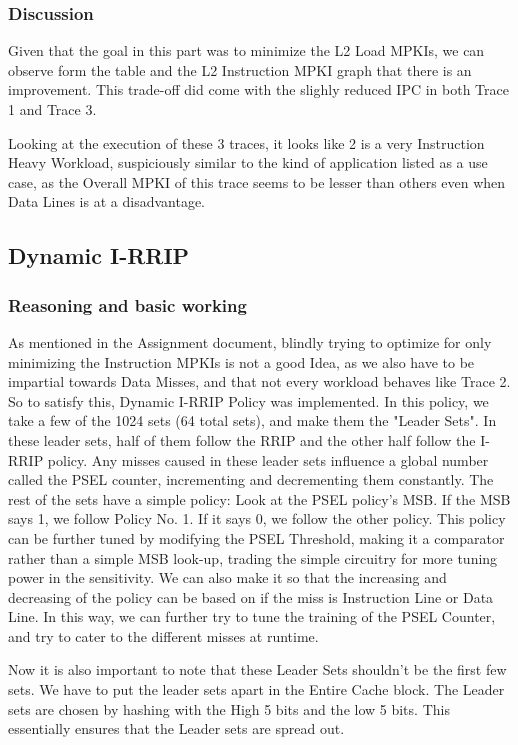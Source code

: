 \documentclass[11pt,a4paper]{article}
\begin{document}
\subsubsection{Discussion}
Given that the goal in this part was to minimize the L2 Load MPKIs, we can observe form the table and the L2 Instruction MPKI graph that there is an improvement. This trade-off did come with the slighly reduced IPC in both Trace 1 and Trace 3.

Looking at the execution of these 3 traces, it looks like 2 is a very Instruction Heavy Workload, suspiciously similar to the kind of application listed as a use case, as the Overall MPKI of this trace seems to be lesser than others even when Data Lines is at a disadvantage.
    
\subsection{Dynamic I-RRIP}
\subsubsection{Reasoning and basic working}
As mentioned in the Assignment document, blindly trying to optimize for only minimizing the Instruction MPKIs is not a good Idea, as we also have to be impartial towards Data Misses, and that not every workload behaves like Trace 2. So to satisfy this, Dynamic I-RRIP Policy was implemented. In this policy, we take a few of the 1024 sets (64 total sets), and make them the "Leader Sets". In these leader sets, half of them follow the RRIP and the other half follow the I-RRIP policy. Any misses caused in these leader sets influence a global number called the PSEL counter, incrementing and decrementing them constantly. The rest of the sets have a simple policy: Look at the PSEL policy's MSB. If the MSB says 1, we follow Policy No. 1. If it says 0, we follow the other policy. This policy can be further tuned by modifying the PSEL Threshold, making it a comparator rather than a simple MSB look-up, trading the simple circuitry for more tuning power in the sensitivity. We can also make it so that the increasing and decreasing of the policy can be based on if the miss is Instruction Line or Data Line. In this way, we can further try to tune the training of the PSEL Counter, and try to cater to the different misses at runtime.

Now it is also important to note that these Leader Sets shouldn't be the first few sets. We have to put the leader sets apart in the Entire Cache block. The Leader sets are chosen by hashing with the High 5 bits and the low 5 bits. This essentially ensures that the Leader sets are spread out.
\end{document}
